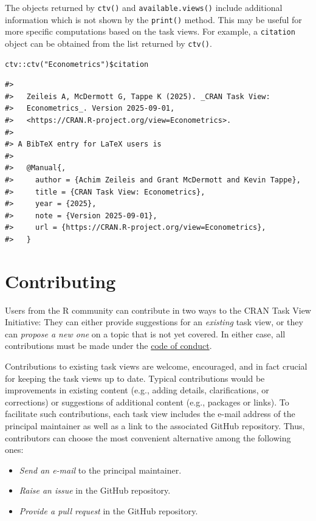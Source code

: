 The objects returned by \texttt{ctv()} and \texttt{available.views()} include additional
information which is not shown by the \texttt{print()} method. This may be useful
for more specific computations based on the task views. For example, a
\texttt{citation} object \citep{bibentry} can be obtained from the list returned by \texttt{ctv()}.

\begin{verbatim}
ctv::ctv("Econometrics")$citation
\end{verbatim}

\begin{verbatim}
#> 
#>   Zeileis A, McDermott G, Tappe K (2025). _CRAN Task View:
#>   Econometrics_. Version 2025-09-01,
#>   <https://CRAN.R-project.org/view=Econometrics>.
#> 
#> A BibTeX entry for LaTeX users is
#> 
#>   @Manual{,
#>     author = {Achim Zeileis and Grant McDermott and Kevin Tappe},
#>     title = {CRAN Task View: Econometrics},
#>     year = {2025},
#>     note = {Version 2025-09-01},
#>     url = {https://CRAN.R-project.org/view=Econometrics},
#>   }
\end{verbatim}

\section{Contributing}\label{sec:contributing}

Users from the R community can contribute in two ways to the CRAN
Task View Initiative: They can either provide suggestions for an \emph{existing}
task view, or they can \emph{propose a new one} on a topic that is not yet covered.
In either case, all contributions must be made under the
\href{https://github.com/cran-task-views/ctv/blob/main/CodeOfConduct.md}{code of conduct}.

Contributions to existing task views are welcome, encouraged, and in fact crucial for
keeping the task views up to date. Typical contributions would be improvements
in existing content (e.g., adding details, clarifications, or corrections) or
suggestions of additional content (e.g., packages or links). To facilitate such
contributions, each task view includes the e-mail address of the principal
maintainer as well as a link to the associated GitHub repository. Thus, contributors
can choose the most convenient alternative among the following ones:

\begin{itemize}
\tightlist
\item
  \emph{Send an e-mail} to the principal maintainer.
\item
  \emph{Raise an issue} in the GitHub repository.
\item
  \emph{Provide a pull request} in the GitHub repository.
\end{itemize}

